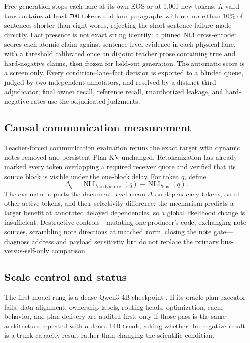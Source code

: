 \documentclass[10pt]{article}
\begin{document}
Free generation stops each lane at its own EOS or at 1,000 new tokens. A
valid lane contains at least 700 tokens and four paragraphs with no more than
10\% of sentences shorter than eight words, rejecting the short-sentence
failure mode directly. Fact presence is not exact string identity: a pinned
NLI cross-encoder scores each atomic claim against sentence-level evidence in
each physical lane, with a threshold calibrated once on disjoint teacher
prose containing true and hard-negative claims, then frozen for held-out
generation. The automatic score is a screen only. Every
condition--lane--fact decision is exported to a blinded queue, judged by two
independent annotators, and resolved by a distinct third adjudicator; final
owner recall, reference recall, unauthorized leakage, and hard-negative rates
use the adjudicated judgments.

\subsection{Causal communication measurement}

Teacher-forced communication evaluation reruns the exact target with dynamic
notes removed and persistent Plan-KV unchanged. Retokenization has already
marked every token overlapping a required receiver quote and verified that
its source block is visible under the one-block delay. For token \(q\),
define
\begin{equation}
\Delta_q
=\operatorname{NLL}_{\mathrm{no\text{-}dynamic}}(q)
-\operatorname{NLL}_{\mathrm{bus}}(q).
\end{equation}
The evaluator reports the document-level mean \(\Delta\) on dependency
tokens, on all other active tokens, and their selectivity difference: the
mechanism predicts a larger benefit at annotated delayed dependencies, so a
global likelihood change is insufficient. Destructive controls---mutating one
producer's code, exchanging note sources, scrambling note directions at
matched norm, closing the note gate---diagnose address and payload
sensitivity but do not replace the primary bus-versus-self-only comparison.

\subsection{Scale control and status}

The first model rung is a dense Qwen3-4B checkpoint \citep{yang2025qwen3}. If
its oracle-plan executor fails, data alignment, ownership labels, routing
heads, optimization, cache behavior, and plan delivery are audited first;
only if those pass is the same architecture repeated with a dense 14B trunk,
asking whether the negative result is a trunk-capacity result rather than
changing the scientific condition.
\end{document}

